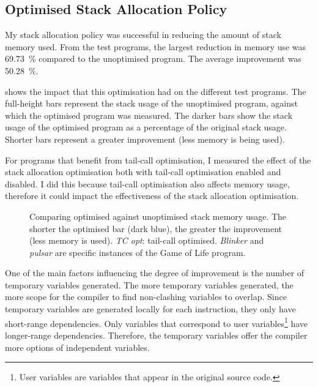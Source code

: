 \documentclass[00-main.tex]{subfiles}
\begin{document}
\subsection{Optimised Stack Allocation Policy}\label{sec:eval:optimised stack allocation}

My stack allocation policy was successful in reducing the amount of stack memory used.
From the test programs, the largest reduction in memory use was \SI{69.73}{\percent} compared to the unoptimised program.
The average improvement was \SI{50.28}{\percent}.

 shows the impact that this optimisation had on the different test programs.
The full-height bars represent the stack usage of the unoptimised program, against which the optimised program was measured.
The darker bars show the stack usage of the optimised program as a percentage of the original stack usage.
Shorter bars represent a greater improvement (less memory is being used).

For programs that benefit from tail-call optimisation, I measured the effect of the stack allocation optimisation both with tail-call optimisation enabled and disabled.
I did this because tail-call optimisation also affects memory usage, therefore it could impact the effectiveness of the stack allocation optimisation.

\begin{figure}[t]
  \centering
  \caption{Comparing optimised against unoptimised stack memory usage. The shorter the optimised bar (dark blue), the greater the improvement (less memory is used). \emph{TC opt}: tail-call optimised. \emph{Blinker} and \emph{pulsar} are specific instances of the Game of Life program.}%
  \label{fig:comparing stack usage optimisation across programs}
\end{figure}

One of the main factors influencing the degree of improvement is the number of temporary variables generated.
The more temporary variables generated, the more scope for the compiler to find non-clashing variables to overlap.
Since temporary variables are generated locally for each instruction, they only have short-range dependencies.
Only variables that correspond to user variables\footnote{User variables are variables that appear in the original source code.} have longer-range dependencies.
Therefore, the temporary variables offer the compiler more options of independent variables.
\end{document}
